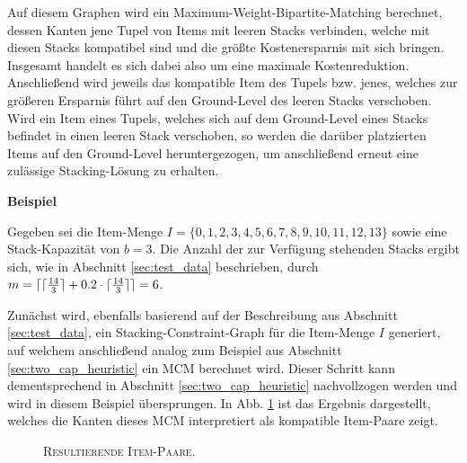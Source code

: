 Auf diesem Graphen wird ein Maximum-Weight-Bipartite-Matching berechnet, dessen Kanten jene Tupel von Items
mit leeren Stacks verbinden, welche mit diesen Stacks kompatibel sind und die größte Kostenersparnis mit sich bringen. Insgesamt handelt es sich dabei also um eine maximale Kostenreduktion.
Anschließend wird jeweils das kompatible Item des Tupels bzw. jenes, welches zur größeren Ersparnis führt auf
den Ground-Level des leeren Stacks verschoben.
Wird ein Item eines Tupels, welches sich auf dem Ground-Level eines Stacks befindet in einen
leeren Stack verschoben, so werden die darüber platzierten Items auf den Ground-Level heruntergezogen,
um anschließend erneut eine zulässige Stacking-Lösung zu erhalten.

\pagebreak

\textbf{Beispiel}

Gegeben sei die Item-Menge $I = \{0, 1, 2, 3, 4, 5, 6, 7, 8, 9, 10, 11, 12, 13\}$ sowie eine Stack-Kapazität von $b = 3$.
Die Anzahl der zur Verfügung stehenden Stacks ergibt sich, wie in Abschnitt \ref{sec:test_data} beschrieben,
durch $m = \lceil\lceil\frac{14}{3}\rceil + 0.2 \cdot  \lceil\frac{14}{3}\rceil\rceil = 6$.

Zunächst wird, ebenfalls basierend auf der Beschreibung aus Abschnitt \ref{sec:test_data}, ein Stacking-Constraint-Graph
für die Item-Menge $I$ generiert, auf welchem anschließend analog zum Beispiel aus Abschnitt \ref{sec:two_cap_heuristic} ein
\textsc{MCM} berechnet wird. Dieser Schritt kann dementsprechend in Abschnitt \ref{sec:two_cap_heuristic} nachvollzogen werden
und wird in diesem Beispiel übersprungen. In Abb. \ref{fig:item_pairs_example_b=3} ist das Ergebnis dargestellt,
welches die Kanten dieses \textsc{MCM} interpretiert als kompatible Item-Paare zeigt.

\begin{figure}[H]
\centering
{}
\caption{\textsc{Resultierende Item-Paare}.}
\label{fig:item_pairs_example_b=3}
\end{figure}

